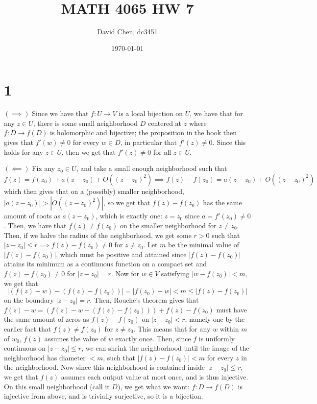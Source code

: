 \documentclass[12pt,letterpaper]{article}
\title{MATH 4065 HW 7}
\author{David Chen, dc3451}
\date{\today}
\theoremstyle{definition}
\begin{document}
\maketitle

\section*{1}

$(\implies)$ Since we have that $f: U \rightarrow V$ is a local bijection on $U$, we have that for any $z \in U$, there is some small neighborhood $D$ centered at $z$ where $f: D \rightarrow f(D)$ is holomorphic and bijective; the proposition in the book then gives that $f'(w) \neq 0$ for every $w \in D$, in particular that $f'(z) \neq 0$. Since this holds for any $z \in U$, then we get that $f'(z) \neq 0$ for all $z \in U$.


$(\impliedby)$ Fix any $z_{0} \in U$, and take a small enough neighborhood such that
\[
  f(z) = f(z_{0}) + a(z - z_{0}) + O((z - z_{0})^{2}) \implies f(z) - f(z_{0}) = a(z - z_{0}) + O((z - z_{0})^{2})
\]
which then gives that on a (possibly) smaller neighborhood, $|a(z - z_{0})| > |O((z - z_{0})^{2})|$, so we get that $f(z) - f(z_{0})$ has the same amount of roots as $a(z - z_{0})$, which is exactly one: $z = z_{0}$ since $a = f'(z_{0}) \neq 0$. Then, we have that $f(z) \neq f(z_{0})$ on the smaller neighborhood for $z \neq z_{0}$. Then, if we halve the radius of the neighborhood, we get some $r > 0$ such that $|z - z_{0}| \leq r \implies f(z) - f(z_{0}) \neq 0$ for $z \neq z_{0}$. Let $m$ be the minimal value of $|f(z) - f(z_{0})|$, which must be positive and attained since $|f(z) - f(z_{0})|$ attains its minimum as a continuous function on a compact set and $f(z) - f(z_{0}) \neq 0$ for $|z - z_{0}| = r$. Now for $w \in V$ satisfying $|w - f(z_{0})| < m$, we get that
\[
  |(f(z) - w) - (f(z) - f(z_{0}))| = |f(z_{0}) - w| < m \leq |f(z) - f(z_{0})|
\]
on the boundary $|z - z_{0}| = r$. Then, Rouche's theorem gives that $f(z) - w = (f(z) - w - (f(z) - f(z_{0}))) + f(z) - f(z_{0})$ must have the same amount of zeros as $f(z) - f(z_{0})$ on $|z - z_{0}| < r$, namely one by the earlier fact that $f(z) \neq f(z_{0})$ for $z \neq z_{0}$. This means that for any $w$ within $m$ of $w_{0}$, $f(z)$ assumes the value of $w$ exactly once. Then, since $f$ is uniformly continuous on $|z - z_{0}| \leq r$, we can shrink the neighborhood until the image of the neighborhood has diameter $< m$, such that $|f(z) - f(z_{0})| < m$ for every $z$ in the neighborhood. Now since this neighborhood is contained inside $|z - z_{0}| \leq r$, we get that $f(z)$ assumes each output value at most once, and is thus injective. On this small neighborhood (call it $D$), we get what we want: $f: D \rightarrow f(D)$ is injective from above, and is trivially surjective, so it is a bijection.
\end{document}
